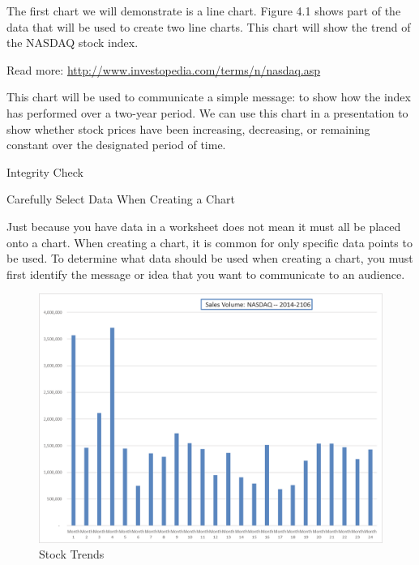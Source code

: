 The first chart we will demonstrate is a line chart. Figure 4.1 shows part of the data that will be used
to create two line charts. This chart will show the trend of the NASDAQ stock index.

Read more: \url{http://www.investopedia.com/terms/n/nasdaq.asp}

This chart will be used to communicate a simple message: to show how the index has performed over
a two-year period. We can use this chart in a presentation to show whether stock prices have been
increasing, decreasing, or remaining constant over the designated period of time.




Integrity Check

Carefully Select Data When Creating a Chart

Just because you have data in a worksheet does not mean it must all be placed onto a chart. When creating a chart,
it is common for only specific data points to be used. To determine what data should be used when creating a chart,
you must first identify the message or idea that you want to communicate to an audience.



\begin{figure}[H]
	\centering
	\includegraphics[width=\maxwidth{.95\linewidth}]{gfx/ch04_fig01}
	\caption{Stock Trends}
	\label{04:fig01}
\end{figure}



